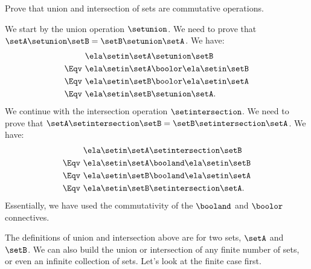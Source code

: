 \begin{exercise}
    Prove that union and intersection of sets are commutative operations.
\end{exercise}

\begin{solution}
    We start by the union operation $\setunion$.
    We need to prove that $\setA \setunion \setB = \setB \setunion \setA$.
    We have:
    \begin{equation*}
        \begin{split}
                    & \ela \setin \setA \setunion \setB           \\
            \Eqv \  & \ela \setin \setA \boolor \ela \setin \setB \\
            \Eqv \  & \ela \setin \setB \boolor \ela \setin \setA \\
            \Eqv \  & \ela \setin \setB \setunion \setA.
        \end{split}
    \end{equation*}
    We continue with the intersection operation $\setintersection$.
    We need to prove that $\setA \setintersection \setB = \setB \setintersection \setA$.
    We have:
    \begin{equation*}
        \begin{split}
                    & \ela \setin \setA \setintersection \setB     \\
            \Eqv \  & \ela \setin \setA \booland \ela \setin \setB \\
            \Eqv \  & \ela \setin \setB \booland \ela \setin \setA \\
            \Eqv \  & \ela \setin \setB \setintersection \setA.
        \end{split}
    \end{equation*}
    Essentially, we have used the commutativity of the $\booland$ and $\boolor$ connectives.
\end{solution}

The definitions of union and intersection above are for two sets, $\setA$ and $\setB$. We can also build the union or intersection of any finite number of sets, or even an infinite collection of sets. Let's look at the finite case first. 


